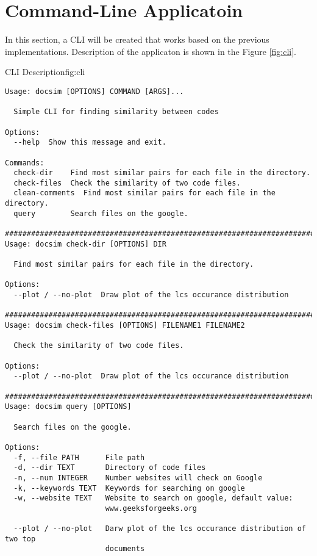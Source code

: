 \section{Command-Line Applicatoin}
In this section, a CLI will be created that works based on the previous
implementations. Description of the applicaton is shown in the Figure \ref{fig:cli}.

\begin{fig-shaded}{CLI Description}{fig:cli}
\begin{lstlisting}[style=BASH, style=mystyle]
Usage: docsim [OPTIONS] COMMAND [ARGS]...

  Simple CLI for finding similarity between codes

Options:
  --help  Show this message and exit.

Commands:
  check-dir    Find most similar pairs for each file in the directory.
  check-files  Check the similarity of two code files.
  clean-comments  Find most similar pairs for each file in the directory.
  query        Search files on the google.

##############################################################################
Usage: docsim check-dir [OPTIONS] DIR

  Find most similar pairs for each file in the directory.

Options:
  --plot / --no-plot  Draw plot of the lcs occurance distribution

##############################################################################
Usage: docsim check-files [OPTIONS] FILENAME1 FILENAME2

  Check the similarity of two code files.

Options:
  --plot / --no-plot  Draw plot of the lcs occurance distribution

##############################################################################
Usage: docsim query [OPTIONS]

  Search files on the google.

Options:
  -f, --file PATH      File path
  -d, --dir TEXT       Directory of code files
  -n, --num INTEGER    Number websites will check on Google
  -k, --keywords TEXT  Keywords for searching on google
  -w, --website TEXT   Website to search on google, default value:
                       www.geeksforgeeks.org

  --plot / --no-plot   Darw plot of the lcs occurance distribution of two top
                       documents

\end{lstlisting}
\end{fig-shaded}

